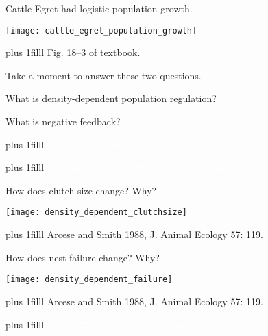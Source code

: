 \documentclass[t]{beamer}
\newcommand\imagecredit[1]{%
	\vskip0pt plus 1filll \tiny #1}%
\begin{document}
\begin{frame}[t,plain]{Cattle Egret had logistic population growth.}
	\begin{center}
		\texttt{[image: cattle\_egret\_population\_growth]}
	\end{center}	

	\imagecredit{\hfill Fig. 18--3 of textbook.}
\end{frame}

\begin{frame}[t,plain]{Take a moment to answer these two questions. }

	\hangpara What is density-dependent population regulation?
	
	\hangpara What is negative feedback?
	
\end{frame}

{
\begin{frame}[t,plain]{}
\imagecredit{\textcolor{white}{Keith, Wikimedia Commons.}}
\end{frame}
}

{
\begin{frame}[t,plain]{}
\imagecredit{\textcolor{white}{K.P. McFarland, Flickr Creative Commons.}}
\end{frame}
}


\begin{frame}[t,plain]{How does clutch size change? Why?}
	\begin{center}
		\texttt{[image: density\_dependent\_clutchsize]}
	\end{center}	

	\imagecredit{Arcese and Smith 1988, J. Animal Ecology 57: 119.}
\end{frame}

\begin{frame}[t,plain]{How does nest failure change? Why?}
	\begin{center}
		\texttt{[image: density\_dependent\_failure]}
	\end{center}	

	\imagecredit{Arcese and Smith 1988, J. Animal Ecology 57: 119.}
\end{frame}

{
\begin{frame}[t,plain]{}
	\imagecredit{\hfill\textcolor{white}{cuatrok77, Wikimedia Commons.}}
\end{frame}
}
\end{document}
